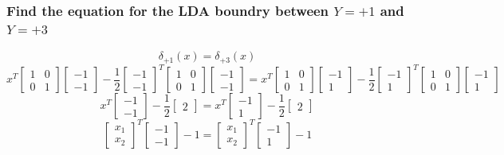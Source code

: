 \documentclass[12pt]{article}
\begin{document}
\subsubsection{Find the equation for the LDA boundry between $Y = +1$ and $Y = +3$}
\[
    \delta_{+1}(x) = \delta_{+3}(x)
\]
\[
    x^T\begin{bmatrix} 1 & 0\\ 0 & 1\end{bmatrix}\begin{bmatrix} -1 \\ -1\end{bmatrix} - \frac{1}{2}\begin{bmatrix} -1 \\ -1\end{bmatrix}^T\begin{bmatrix} 1 & 0\\ 0 & 1\end{bmatrix}\begin{bmatrix} -1 \\ -1\end{bmatrix}
    =
    x^T\begin{bmatrix} 1 & 0\\ 0 & 1\end{bmatrix}\begin{bmatrix} -1 \\ 1\end{bmatrix} - \frac{1}{2}\begin{bmatrix} -1 \\ 1\end{bmatrix}^T\begin{bmatrix} 1 & 0\\ 0 & 1\end{bmatrix}\begin{bmatrix} -1 \\ 1\end{bmatrix}
\]
\[
    x^T\begin{bmatrix} -1 \\ -1\end{bmatrix}-\frac{1}{2}\begin{bmatrix}2\end{bmatrix}
    =
    x^T\begin{bmatrix} -1 \\ 1\end{bmatrix}-\frac{1}{2}\begin{bmatrix}2\end{bmatrix}
\]
\[
    \begin{bmatrix} x_1 \\ x_2\end{bmatrix}^T\begin{bmatrix} -1 \\ -1\end{bmatrix}-1
    =
    \begin{bmatrix} x_1 \\ x_2\end{bmatrix}^T\begin{bmatrix} -1 \\ 1\end{bmatrix} -1
\]
\end{document}
